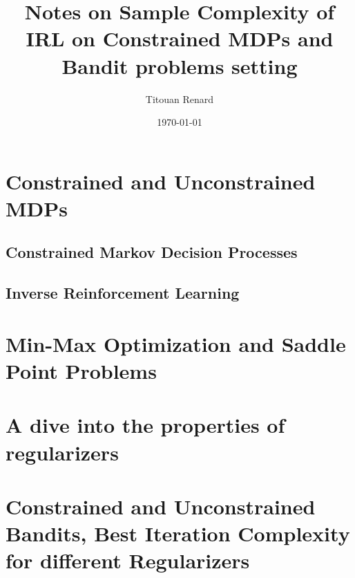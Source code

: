 \documentclass[11pt]{article}
\title{Notes on Sample Complexity of IRL on Constrained MDPs and Bandit problems setting}
\date{\today}
\author{Titouan Renard}
\begin{document}
\maketitle	

\tableofcontents

\section{Constrained and Unconstrained MDPs}


\newpage
\subsection{Constrained Markov Decision Processes} \label{sec:cmdps}


\newpage
\subsection{Inverse Reinforcement Learning} \label{sec:irl}


\newpage
\section{Min-Max Optimization and Saddle Point Problems}


\section{A dive into the properties of regularizers}


\newpage
\section{Constrained and Unconstrained Bandits, Best Iteration Complexity for different Regularizers}


\newpage
\printbibliography
\end{document}

